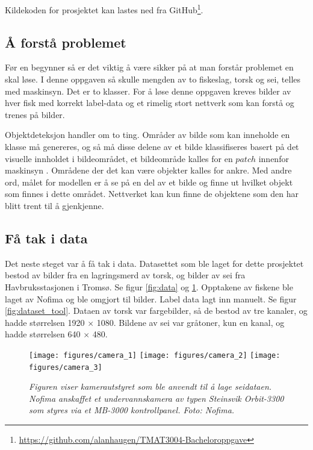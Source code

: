 Kildekoden for prosjektet kan lastes ned fra GitHub\footnote{\url{https://github.com/alanhaugen/TMAT3004-Bacheloroppgave}}.

\subsection{Å forstå problemet}

Før en begynner så er det viktig å være sikker på at man forstår problemet en skal løse. I denne oppgaven så skulle mengden av to fiskeslag, torsk og sei, telles med maskinsyn. Det er to klasser. For å løse denne oppgaven kreves bilder av hver fisk med korrekt label-data og et rimelig stort nettverk som kan forstå og trenes på bilder.

Objektdeteksjon handler om to ting. Områder av bilde som kan inneholde en klasse må genereres, og så må disse delene av et bilde klassifiseres basert på det visuelle innholdet i bildeområdet, et bildeområde kalles for en $patch$ innenfor maskinsyn \cite{LeCun m.fl. 1998 s. 23}. Områdene der det kan være objekter kalles for ankre. Med andre ord, målet for modellen er å se på en del av et bilde og finne ut hvilket objekt som finnes i dette området. Nettverket kan kun finne de objektene som den har blitt trent til å gjenkjenne.

\subsection{Få tak i data}

Det neste steget var å få tak i data. Datasettet som ble laget for dette prosjektet bestod av bilder fra en lagringsmerd av torsk, og bilder av sei fra Havbruksstasjonen i Tromsø. Se figur \ref{fig:data} og \ref{fig:nofima}. Opptakene av fiskene ble laget av Nofima og ble omgjort til bilder. Label data lagt inn manuelt. Se figur \ref{fig:dataset_tool}. Dataen av torsk var fargebilder, så de bestod av tre kanaler, og hadde størrelsen 1920 $\times$ 1080. Bildene av sei var gråtoner, kun en kanal, og hadde størrelsen 640 $\times$ 480. %

\begin{figure}[h!]
\begin{center} 
\texttt{[image: figures/camera\_1]}
\texttt{[image: figures/camera\_2]}
\texttt{[image: figures/camera\_3]}
\caption{\small \sl Figuren viser kamerautstyret som ble anvendt til å lage seidataen. Nofima anskaffet et undervannskamera av typen Steinsvik Orbit-3300 som styres via et MB-3000 kontrollpanel. Foto: Nofima. \cite{Lindberg 2020} \label{fig:nofima}} 
\end{center} 
\end{figure} 

